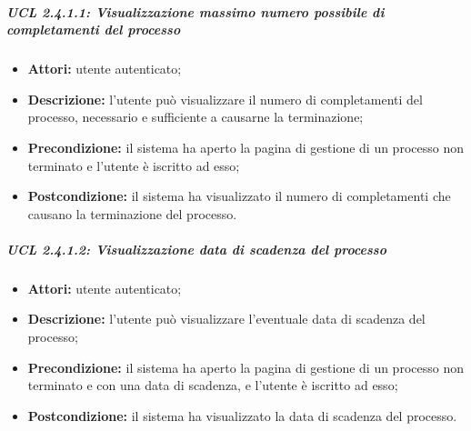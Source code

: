 \subparagraph{UCL 2.4.1.1: Visualizzazione massimo numero possibile di completamenti del processo}
\begin{itemize}
\item \textbf{Attori:} utente autenticato;
\item \textbf{Descrizione:} l'utente può visualizzare il numero di completamenti del processo, necessario e sufficiente a causarne la terminazione;
\item \textbf{Precondizione:} il sistema ha aperto la pagina di gestione di un processo non terminato e l'utente è iscritto ad esso;
\item \textbf{Postcondizione:} il sistema ha visualizzato il numero di completamenti che causano la terminazione del processo.
\end{itemize}

\subparagraph{UCL 2.4.1.2: Visualizzazione data di scadenza del processo}
\begin{itemize}
\item \textbf{Attori:} utente autenticato;
\item \textbf{Descrizione:} l'utente può visualizzare l'eventuale data di scadenza del processo;
\item \textbf{Precondizione:} il sistema ha aperto la pagina di gestione di un processo  non terminato e con una data di scadenza, e l'utente è iscritto ad esso;
\item \textbf{Postcondizione:} il sistema ha visualizzato la data di scadenza del processo.
\end{itemize}

